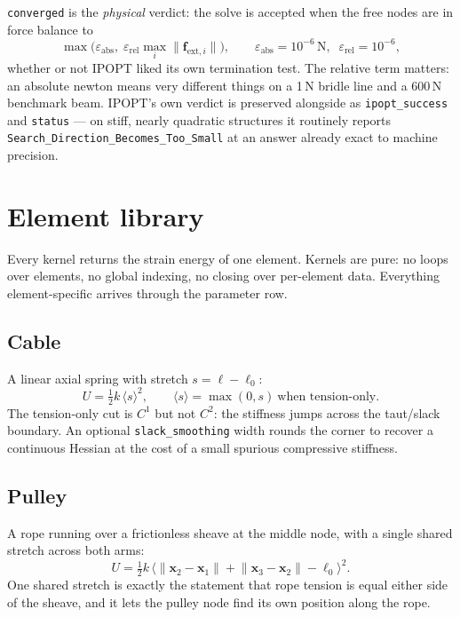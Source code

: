 \documentclass[11pt,a4paper]{article}
\newcommand{\code}[1]{\texttt{\small #1}}
\begin{document}
\code{converged} is the \emph{physical} verdict: the solve is accepted when the
free nodes are in force balance to
\[
  \max\big(\varepsilon_{\text{abs}},\; \varepsilon_{\text{rel}}\max_i\lVert \mathbf{f}_{\text{ext},i}\rVert\big),
  \qquad \varepsilon_{\text{abs}} = 10^{-6}\,\text{N},\;\; \varepsilon_{\text{rel}} = 10^{-6},
\]
whether or not IPOPT liked its own termination test. The relative term matters:
an absolute newton means very different things on a 1\,N bridle line and a
600\,N benchmark beam. IPOPT's own verdict is preserved alongside as
\code{ipopt\_success} and \code{status} --- on stiff, nearly quadratic
structures it routinely reports \code{Search\_Direction\_Becomes\_Too\_Small} at
an answer already exact to machine precision.

\section{Element library}

Every kernel returns the strain energy of one element. Kernels are pure: no
loops over elements, no global indexing, no closing over per-element data.
Everything element-specific arrives through the parameter row.

\subsection{Cable}

A linear axial spring with stretch $s = \ell - \ell_0$:
\begin{equation}
  U = \tfrac{1}{2}k\,\langle s\rangle^2,
  \qquad \langle s\rangle = \max(0, s)\ \text{when tension-only}.
\end{equation}
The tension-only cut is $C^1$ but not $C^2$: the stiffness jumps across the
taut/slack boundary. An optional \code{slack\_smoothing} width rounds the corner
to recover a continuous Hessian at the cost of a small spurious compressive
stiffness.

\subsection{Pulley}

A rope running over a frictionless sheave at the middle node, with a single
shared stretch across both arms:
\begin{equation}
  U = \tfrac{1}{2}k\,\big\langle \lVert\mathbf{x}_2-\mathbf{x}_1\rVert
    + \lVert\mathbf{x}_3-\mathbf{x}_2\rVert - \ell_0 \big\rangle^2 .
\end{equation}
One shared stretch is exactly the statement that rope tension is equal either
side of the sheave, and it lets the pulley node find its own position along the
rope.
\end{document}
